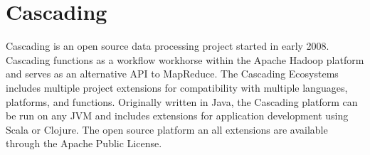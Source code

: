 \section{Cascading}

Cascading is an open source data processing project started in early
2008. Cascading functions as a workflow workhorse within the Apache Hadoop
platform and serves as an alternative API to MapReduce. The Cascading Ecosystems
includes multiple project extensions for compatibility with multiple languages,
platforms, and functions\cite{CascadingEco}. Originally written in Java, the
Cascading platform can be run on any JVM and includes extensions for application
development using Scala or Clojure. The open source platform an all extensions
are available through the Apache Public License\cite{GitHubCascading}.
